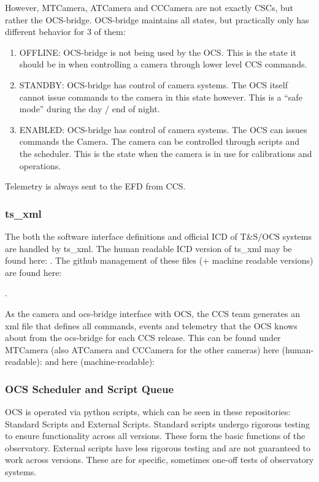 However, MTCamera, ATCamera and CCCamera are not exactly CSCs, but rather the OCS-bridge. OCS-bridge maintains all states, but practically only has different behavior for 3 of them: 
\begin{enumerate}
    \item OFFLINE: OCS-bridge is not being used by the OCS. This is the state it should be in when controlling a camera through lower level CCS commands.
    \item STANDBY: OCS-bridge has control of camera systems. The OCS itself cannot issue commands to the camera in this state however. This is a “safe mode” during the day / end of night.
    \item ENABLED: OCS-bridge has control of camera systems. The OCS can issues commands the Camera. The camera can be controlled through scripts and the scheduler. This is the state when the camera is in use for calibrations and operations.
\end{enumerate}
Telemetry is always sent to the EFD from CCS.

\subsubsection{ts\_xml}
The both the software interface definitions and official ICD of T\&S/OCS systems are handled by ts\_xml. The human readable ICD version of ts\_xml may be found here: . The github management of these files (+ machine readable versions) are found here: 

 . 

As the camera and ocs-bridge interface with OCS, the CCS team generates an xml file that defines all commands, events and telemetry that the OCS knows about from the ocs-bridge for each CCS release. This can be found under MTCamera (also ATCamera and CCCamera for the other cameras) here (human-readable): 
  and here (machine-readable):  

\subsubsection{OCS Scheduler and Script Queue}
OCS is operated via python scripts, which can be seen in these repositories: Standard Scripts and External Scripts. Standard scripts undergo rigorous testing to ensure functionality across all versions. These form the basic functions of the observatory. External scripts have less rigorous testing and are not guaranteed to work across versions. These are for specific, sometimes one-off tests of observatory systems.

